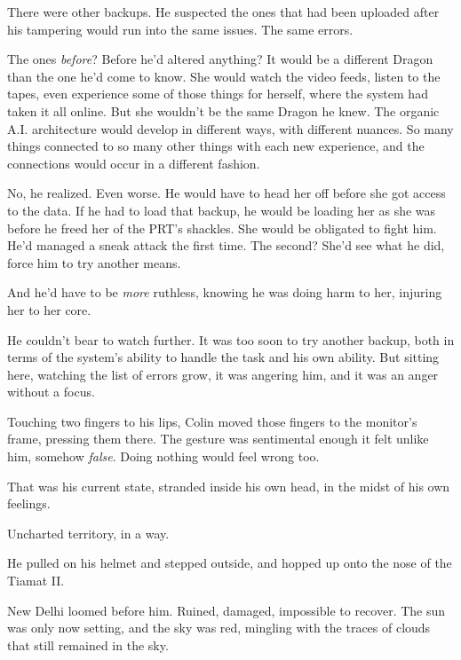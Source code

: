 There were other backups.  He suspected the ones that had been uploaded after his tampering would run into the same issues.  The same errors.



The ones \emph{before}?  Before he'd altered anything?  It would be a different Dragon than the one he'd come to know.  She would watch the video feeds, listen to the tapes, even experience some of those things for herself, where the system had taken it all online.  But she wouldn't be the same Dragon he knew.  The organic A.I. architecture would develop in different ways, with different nuances.  So many things connected to so many other things with each new experience, and the connections would occur in a different fashion.



No, he realized.  Even worse.  He would have to head her off before she got access to the data.  If he had to load that backup, he would be loading her as she was before he freed her of the PRT's shackles.  She would be obligated to fight him.  He'd managed a sneak attack the first time.  The second?  She'd see what he did, force him to try another means.



And he'd have to be \emph{more} ruthless, knowing he was doing harm to her, injuring her to her core.



He couldn't bear to watch further.  It was too soon to try another backup, both in terms of the system's ability to handle the task and his own ability.  But sitting here, watching the list of errors grow, it was angering him, and it was an anger without a focus.



Touching two fingers to his lips, Colin moved those fingers to the monitor's frame, pressing them there.  The gesture was sentimental enough it felt unlike him, somehow \emph{false}.  Doing nothing would feel wrong too.



That was his current state, stranded inside his own head, in the midst of his own feelings.



Uncharted territory, in a way.



He pulled on his helmet and stepped outside, and hopped up onto the nose of the Tiamat II.



New Delhi loomed before him.  Ruined, damaged, impossible to recover.  The sun was only now setting, and the sky was red, mingling with the traces of clouds that still remained in the sky.



